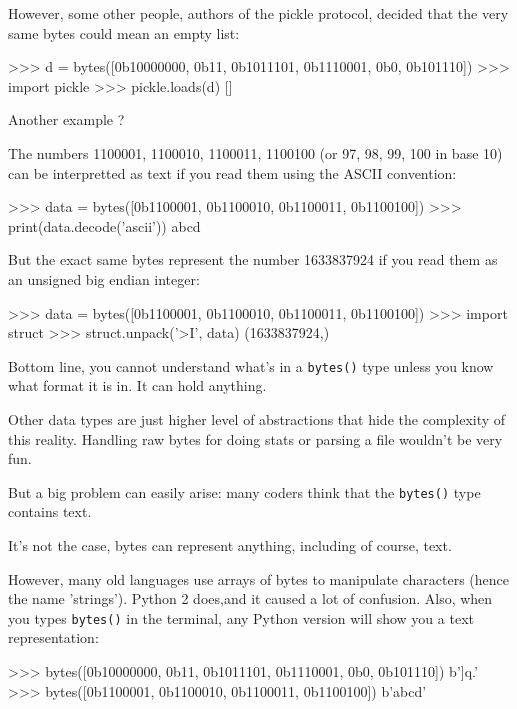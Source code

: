 However, some other people, authors of the pickle protocol, decided that the very same bytes could mean an empty list:

\begin{py2and3}
>>> d = bytes([0b10000000, 0b11, 0b1011101, 0b1110001, 0b0, 0b101110])
>>> import pickle
>>> pickle.loads(d)
[]
\end{py2and3}

Another example ?

The numbers 1100001, 1100010, 1100011, 1100100 (or 97, 98, 99, 100 in base 10) can be interpretted as text if you read them using the ASCII convention:

\begin{py2and3}
>>> data = bytes([0b1100001, 0b1100010, 0b1100011, 0b1100100])
>>> print(data.decode('ascii'))
abcd
\end{py2and3}

But the exact same bytes represent the number 1633837924 if you read them as an unsigned big endian integer:

\begin{py2and3}
>>> data = bytes([0b1100001, 0b1100010, 0b1100011, 0b1100100])
>>> import struct
>>> struct.unpack('>I', data)
(1633837924,)
\end{py2and3}

Bottom line, you cannot understand what's in a \lstinline{bytes()} type unless you know what format it is in. It can hold anything.

Other data types are just higher level of abstractions that hide the complexity of this reality. Handling raw bytes for doing stats or parsing a file wouldn't be very fun.

But a big problem can easily arise: many coders think that the \lstinline{bytes()} type contains text.

It's not the case, bytes can represent anything, including of course, text.

However, many old languages use arrays of bytes to manipulate characters (hence the name 'strings'). Python 2 does,and it caused a lot of confusion. Also, when you types \lstinline{bytes()} in the terminal, any Python version will  show you a text representation:


\begin{py2and3}
>>> bytes([0b10000000, 0b11, 0b1011101, 0b1110001, 0b0, 0b101110])
b']q.'
>>> bytes([0b1100001, 0b1100010, 0b1100011, 0b1100100])
b'abcd'
\end{py2and3}

